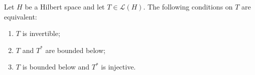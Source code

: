 Let $H$ be a Hilbert space and let $T \in \mathcal{L}(H)$. The following conditions on $T$ are equivalent:
\begin{enumerate}
\item[(a)] $T$ is invertible;
\item[(b)] $T$ and $T^*$ are bounded below;
\item[(c)] $T$ is bounded below and $T^*$ is injective.
\end{enumerate}
